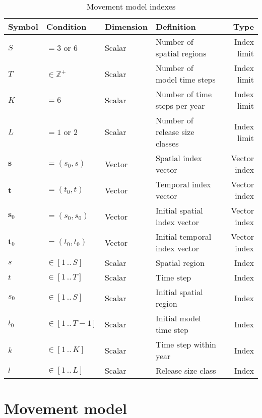 \documentclass{article}
\begin{document}
\begin{table}[ht]
  \centering
  \caption{Movement model indexes}
  \renewcommand\arraystretch{1.2}
  \label{tab:model-indexes}
  \begin{tabular}{l l l l r}
    \toprule
    \textbf{Symbol} & \textbf{Condition} & \textbf{Dimension} & \textbf{Definition} & \textbf{Type} \\
    \toprule
    $S$ & $= 3$ or $6$ & Scalar & Number of spatial regions & Index limit \\
    $T$ & $\in \mathbb{Z}^{+}$ & Scalar & Number of model time steps & Index limit \\
    $K$ & $= 6$ & Scalar & Number of time steps per year & Index limit \\
    $L$ & $= 1$ or $2$ & Scalar & Number of release size classes & Index limit \\
    \midrule
    $\boldsymbol{s}$ & $= (s_0, s)$ & Vector & Spatial index vector & Vector index \\
    $\boldsymbol{t}$ & $= (t_0, t)$ & Vector & Temporal index vector & Vector index \\
    $\boldsymbol{s}_0$ & $= (s_0, s_0)$ & Vector & Initial spatial index vector & Vector index \\
    $\boldsymbol{t}_0$ & $= (t_0, t_0)$ & Vector & Initial temporal index vector & Vector index \\
    \midrule
    $s$ & $\in \left[1 \, .. \, S \right]$ & Scalar & Spatial region & Index \\
    $t$ & $\in \left[1 \, .. \, T \right]$ & Scalar & Time step & Index \\
    $s_0$ & $\in \left[1 \, .. \, S \right]$ & Scalar & Initial spatial region & Index \\
    $t_0$ & $\in \left[1 \, .. \, T \! - \! 1 \right]$ & Scalar & Initial model time step & Index \\
    $k$ & $\in \left[1 \, .. \, K \right]$ & Scalar & Time step within year & Index \\
    $l$ & $\in \left[1 \, .. \, L \right]$ & Scalar & Release size class & Index \\
    \bottomrule
  \end{tabular}
\end{table}


\section{Movement model}
\end{document}
